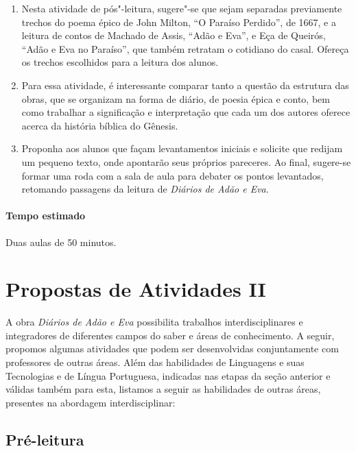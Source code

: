 \documentclass[12pt]{extarticle}
\begin{document}
\begin{enumerate}
\item
Nesta atividade de pós"-leitura, sugere"-se que sejam separadas previamente
trechos do poema épico de John Milton, ``O Paraíso Perdido'', 
de 1667, e a leitura de contos de 
Machado de Assis, ``Adão e Eva'', e Eça de Queirós, 
``Adão e Eva no Paraíso'', que também retratam o cotidiano 
do casal. Ofereça os trechos escolhidos para a leitura dos alunos. 

\item
Para essa atividade, é interessante comparar tanto a questão
da estrutura das obras, que se organizam na forma de diário, de poesia
épica e conto, bem como trabalhar a significação e interpretação que cada um dos
autores oferece acerca da história bíblica do Gênesis. 

\item
Proponha aos alunos que façam levantamentos iniciais e 
solicite que redijam um pequeno texto,
onde apontarão seus próprios pareceres. Ao final, sugere-se formar uma
roda com a sala de aula para debater os pontos levantados, 
retomando passagens da leitura de \emph{Diários de Adão e Eva}.

\end{enumerate}


\paragraph{Tempo estimado} Duas aulas de 50 minutos. 

\section{Propostas de Atividades II}

A obra \emph{Diários de Adão e Eva} possibilita trabalhos
interdisciplinares e integradores de diferentes campos do saber e áreas
de conhecimento. A seguir, propomos algumas atividades que podem ser
desenvolvidas conjuntamente com professores de outras áreas. Além das
habilidades de Linguagens e suas Tecnologias e de Língua Portuguesa,
indicadas nas etapas da seção anterior e válidas também para esta,
listamos a seguir as habilidades de outras áreas, presentes na abordagem
interdisciplinar:

\subsection{Pré-leitura}
\end{document}
